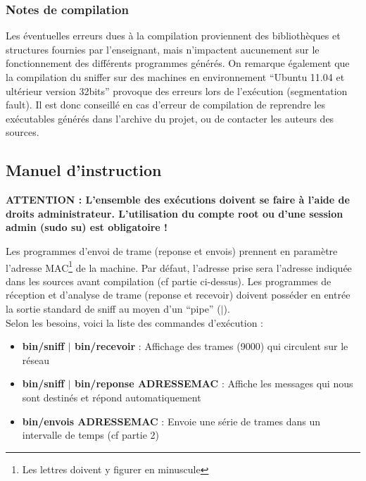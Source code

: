 \documentclass[a4paper,11pt]{article}
\begin{document}
		\subsubsection{Notes de compilation}
		Les éventuelles erreurs dues à la compilation proviennent des bibliothèques et structures fournies par l'enseignant, mais n'impactent aucunement sur le fonctionnement des différents programmes générés. On remarque également que la compilation du sniffer sur des machines en environnement ``Ubuntu 11.04 et ultérieur version 32bits'' provoque des erreurs lors de l'exécution (segmentation fault). Il est donc conseillé en cas d'erreur de compilation de reprendre les exécutables générés dans l'archive du projet, ou de contacter les auteurs des sources.
		\subsection{Manuel d'instruction}
		\textbf{ATTENTION : L'ensemble des exécutions doivent se faire à l'aide de droits administrateur. L'utilisation du compte root ou d'une session admin (sudo su) est obligatoire !}
		
		
		
		Les programmes d'envoi de trame (reponse et envois) prennent en paramètre l'adresse MAC\footnote{Les lettres doivent y figurer en minuscule} de la machine. Par défaut, l'adresse prise sera l'adresse indiquée dans les sources avant compilation (cf partie ci-dessus). Les programmes de réception et d'analyse de trame (reponse et recevoir) doivent posséder en entrée la sortie standard de sniff au moyen d'un ``pipe'' ($|$).\\
		Selon les besoins, voici la liste des commandes d'exécution :
		\begin{itemize}
		\item \textbf{bin/sniff $|$ bin/recevoir} : Affichage des trames (9000) qui circulent sur le réseau
		\item \textbf{bin/sniff $|$ bin/reponse ADRESSEMAC} : Affiche les messages qui nous sont destinés et répond automatiquement
		\item \textbf{bin/envois ADRESSEMAC} :		 Envoie une série de trames dans un intervalle de temps (cf partie 2)
		\end{itemize}
\end{document}
